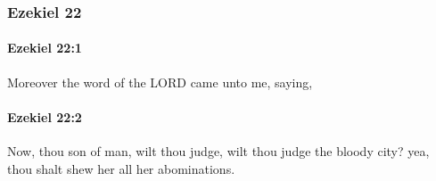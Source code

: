 	\subsubsection{Ezekiel 22} %
		\label{EZEKIEL-22}

		\paragraph{Ezekiel 22:1} %
			\label{EZEKIEL-22-1}

			Moreover the word of the LORD came unto me, saying,


		\paragraph{Ezekiel 22:2} %
			\label{EZEKIEL-22-2}

			Now, thou son of man, wilt thou judge, wilt thou judge the bloody city? yea, thou shalt shew her all her abominations.

